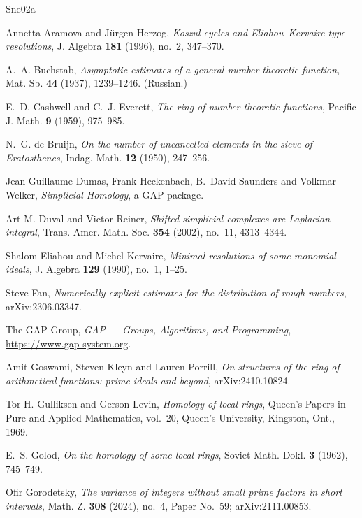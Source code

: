 \documentclass[a4paper,11pt,oneside,reqno]{amsart}
\theoremstyle{definition}
\theoremstyle{remark}
\theoremstyle{plain}
\begin{document}
\begin{thebibliography}{Sne02a}

Annetta Aramova and Jürgen Herzog,
\emph{Koszul cycles and Eliahou--Kervaire type resolutions},
J. Algebra \textbf{181} (1996), no.~2, 347--370.

A.~A. Buchstab,
\emph{Asymptotic estimates of a general number-theoretic function},
Mat. Sb. \textbf{44} (1937), 1239--1246. (Russian.)

E.~D. Cashwell and C.~J. Everett,
\emph{The ring of number-theoretic functions},
Pacific J. Math. \textbf{9} (1959), 975--985.

N.~G. de Bruijn,
\emph{On the number of uncancelled elements in the sieve of Eratosthenes},
Indag. Math. \textbf{12} (1950), 247--256.

Jean-Guillaume Dumas, Frank Heckenbach, B.~David Saunders and Volkmar Welker,
\emph{Simplicial Homology}, a \textsf{GAP} package.

Art M. Duval and Victor Reiner,
\emph{Shifted simplicial complexes are Laplacian integral},
Trans. Amer. Math. Soc. \textbf{354} (2002), no.~11, 4313--4344.

Shalom Eliahou and Michel Kervaire,
\emph{Minimal resolutions of some monomial ideals},
J. Algebra \textbf{129} (1990), no.~1, 1--25.

Steve Fan,
\emph{Numerically explicit estimates for the distribution of rough numbers},
arXiv:2306.03347.

The GAP Group,
\emph{GAP --- Groups, Algorithms, and Programming},
\url{https://www.gap-system.org}.

Amit Goswami, Steven Kleyn and Lauren Porrill,
\emph{On structures of the ring of arithmetical functions: prime ideals and
beyond}, arXiv:2410.10824.

Tor H. Gulliksen and Gerson Levin,
\emph{Homology of local rings},
Queen's Papers in Pure and Applied Mathematics, vol.~20, Queen's University,
Kingston, Ont., 1969.

E.~S. Golod,
\emph{On the homology of some local rings},
Soviet Math. Dokl. \textbf{3} (1962), 745--749.

Ofir Gorodetsky,
\emph{The variance of integers without small prime factors in short intervals},
Math. Z. \textbf{308} (2024), no.~4, Paper No.~59; arXiv:2111.00853.


\end{thebibliography}
\end{document}
